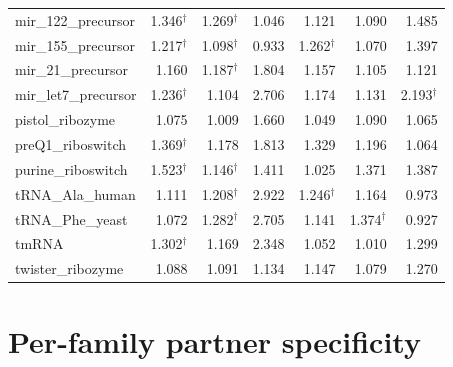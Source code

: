 \documentclass[11pt]{article}
\begin{document}
\begin{longtable}{@{}lrrrrrr@{}}
mir\_122\_precursor & 1.346$^\dagger$ & 1.269$^\dagger$ & 1.046 & 1.121 & 1.090 & 1.485 \\
mir\_155\_precursor & 1.217$^\dagger$ & 1.098$^\dagger$ & 0.933 & 1.262$^\dagger$ & 1.070 & 1.397 \\
mir\_21\_precursor & 1.160 & 1.187$^\dagger$ & 1.804 & 1.157 & 1.105 & 1.121 \\
mir\_let7\_precursor & 1.236$^\dagger$ & 1.104 & 2.706 & 1.174 & 1.131 & 2.193$^\dagger$ \\
pistol\_ribozyme & 1.075 & 1.009 & 1.660 & 1.049 & 1.090 & 1.065 \\
preQ1\_riboswitch & 1.369$^\dagger$ & 1.178 & 1.813 & 1.329 & 1.196 & 1.064 \\
purine\_riboswitch & 1.523$^\dagger$ & 1.146$^\dagger$ & 1.411 & 1.025 & 1.371 & 1.387 \\
tRNA\_Ala\_human & 1.111 & 1.208$^\dagger$ & 2.922 & 1.246$^\dagger$ & 1.164 & 0.973 \\
tRNA\_Phe\_yeast & 1.072 & 1.282$^\dagger$ & 2.705 & 1.141 & 1.374$^\dagger$ & 0.927 \\
tmRNA & 1.302$^\dagger$ & 1.169 & 2.348 & 1.052 & 1.010 & 1.299 \\
twister\_ribozyme & 1.088 & 1.091 & 1.134 & 1.147 & 1.079 & 1.270 \\
\bottomrule
\end{longtable}


\section*{Per-family partner specificity}
\end{document}
